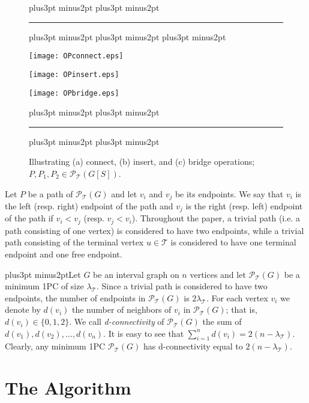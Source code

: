 \documentclass[10pt]{article}
\def\yskip{\penalty-50\vskip3pt plus3pt minus2pt}
\def\y{\yskip}
\def\yy{\yskip\yskip}
\def\yyy{\yskip\yskip\yskip}
\begin{document}
\begin{figure}[t]
\yy \hrule \yyy
  \centering
   \begin{minipage}[c]{2in}
    \centering
    \texttt{[image: OPconnect.eps]}
  \end{minipage}
  \begin{minipage}[c]{2in}
    \centering
    \texttt{[image: OPinsert.eps]}
  \end{minipage}
  \begin{minipage}[c]{2in}
    \centering
    \texttt{[image: OPbridge.eps]}
  \end{minipage}
\caption{\small{Illustrating (a) connect, (b) insert, and (c) bridge operations; $P,P_1,P_2 \in
\mathcal{P_{\mathcal{T}}}(G[S])$.}} \yy \hrule \y\y
\label{operations}
\end{figure}

Let $P$ be a path of $\mathcal{P_{\mathcal{T}}}(G)$ and let $v_i$
and $v_j$ be its endpoints. We say that $v_i$ is the left (resp.
right) endpoint of the path and $v_j$ is the right (resp. left)
endpoint of the path if $v_i < v_j$ (resp. $v_j < v_i$).
Throughout the paper, a trivial path (i.e. a path consisting of
one vertex) is considered to have two endpoints, while a trivial
path consisting of the terminal vertex $u \in \mathcal{T}$ is
considered to have one terminal endpoint and one free endpoint.

\y Let $G$ be an interval graph on $n$ vertices and let
$\mathcal{P_{\mathcal{T}}}(G)$ be a minimum 1PC of size
$\lambda_\mathcal{T}$. Since a trivial path is considered to have
two endpoints, the number of endpoints in
$\mathcal{P_{\mathcal{T}}}(G)$ is $2\lambda_\mathcal{T}$. For each
vertex $v_i$ we denote by $d(v_i)$ the number of neighbors of
$v_i$ in $\mathcal{P_{\mathcal{T}}}(G)$; that is, $d(v_i) \in
\{0,1,2\}$. We call {\it d-connectivity} of
$\mathcal{P_{\mathcal{T}}}(G)$ the sum of $d(v_1), d(v_2), \ldots,
d(v_n)$. It is easy to see that $\sum^n_{i=1} d(v_i)=
2(n-\lambda_\mathcal{T})$. Clearly, any minimum 1PC
$\mathcal{P_{\mathcal{T}}}(G)$ has d-connectivity equal to
$2(n-\lambda_\mathcal{T})$.

\vskip 0.3in \section{The Algorithm}
\end{document}
